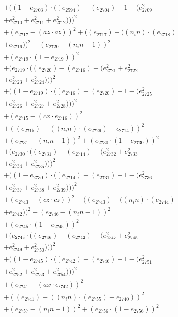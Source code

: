 \documentclass[10pt, a4paper]{article}
\begin{document}
\begin{small}
\begin{align*}
& + ((1 - e_{2703})  \cdot  ((e_{2594}) - (e_{2704}) - 1 - (e_{2709}^{2} \\
& + e_{2710}^{2} + e_{2711}^{2} + e_{2712}^{2})))^{2} \\
& + (e_{2717} - (az  \cdot  az))^{2} + ((e_{2717}) - ((n_in)  \cdot  (e_{2718}) \\
& + e_{2716}))^{2} + (e_{2720} - (n_in - 1))^{2} \\
& + (e_{2719}  \cdot  (1 - e_{2719}))^{2} \\
& + (e_{2719}  \cdot  ((e_{2720}) - (e_{2716}) - (e_{2721}^{2} + e_{2722}^{2} \\
& + e_{2723}^{2} + e_{2724}^{2})))^{2} \\
& + ((1 - e_{2719})  \cdot  ((e_{2716}) - (e_{2720}) - 1 - (e_{2725}^{2} \\
& + e_{2726}^{2} + e_{2727}^{2} + e_{2728}^{2})))^{2} \\
& + (e_{2715} - (cx  \cdot  e_{2716}))^{2} \\
& + ((e_{2715}) - ((n_in)  \cdot  (e_{2729}) + e_{2714}))^{2} \\
& + (e_{2731} - (n_in - 1))^{2} + (e_{2730}  \cdot  (1 - e_{2730}))^{2} \\
& + (e_{2730}  \cdot  ((e_{2731}) - (e_{2714}) - (e_{2732}^{2} + e_{2733}^{2} \\
& + e_{2734}^{2} + e_{2735}^{2})))^{2} \\
& + ((1 - e_{2730})  \cdot  ((e_{2714}) - (e_{2731}) - 1 - (e_{2736}^{2} \\
& + e_{2737}^{2} + e_{2738}^{2} + e_{2739}^{2})))^{2} \\
& + (e_{2743} - (cz  \cdot  cz))^{2} + ((e_{2743}) - ((n_in)  \cdot  (e_{2744}) \\
& + e_{2742}))^{2} + (e_{2746} - (n_in - 1))^{2} \\
& + (e_{2745}  \cdot  (1 - e_{2745}))^{2} \\
& + (e_{2745}  \cdot  ((e_{2746}) - (e_{2742}) - (e_{2747}^{2} + e_{2748}^{2} \\
& + e_{2749}^{2} + e_{2750}^{2})))^{2} \\
& + ((1 - e_{2745})  \cdot  ((e_{2742}) - (e_{2746}) - 1 - (e_{2751}^{2} \\
& + e_{2752}^{2} + e_{2753}^{2} + e_{2754}^{2})))^{2} \\
& + (e_{2741} - (ax  \cdot  e_{2742}))^{2} \\
& + ((e_{2741}) - ((n_in)  \cdot  (e_{2755}) + e_{2740}))^{2} \\
& + (e_{2757} - (n_in - 1))^{2} + (e_{2756}  \cdot  (1 - e_{2756}))^{2} \\

\end{align*}
\end{small}
\end{document}
